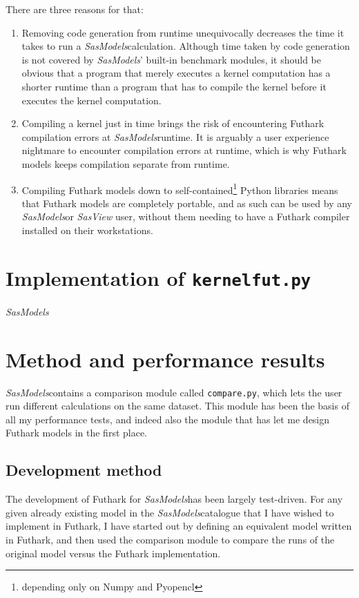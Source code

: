 \documentclass[11pt]{article}
\newcommand{\sasmodels}{\textit{SasModels}}
\newcommand{\sasview}{\textit{SasView}}
\begin{document}
There are three reasons for that:
\begin{enumerate}
  \item Removing code generation from runtime unequivocally decreases the time
  it takes to run a \sasmodels calculation. Although time taken by code 
  generation is not covered by \sasmodels' built-in benchmark modules, it should
  be obvious that a program that merely executes a kernel computation has a 
  shorter runtime than a program that has to compile the kernel before it
  executes the kernel computation.
  
  \item Compiling a kernel just in time brings the risk of encountering 
  Futhark compilation errors at \sasmodels runtime. 
  It is arguably a user experience nightmare to encounter compilation errors at 
  runtime, which is why Futhark models keeps compilation separate from runtime.
  
  \item Compiling Futhark models down to self-contained\footnote{depending only 
  on Numpy and Pyopencl} Python libraries means that Futhark models are 
  completely portable, and as such can be used by any \sasmodels or \sasview 
  user, without them needing to have a Futhark compiler installed on their 
  workstations.
\end{enumerate}

\section{Implementation of \texttt{kernelfut.py}}
\sasmodels 


\section{Method and performance results}
\sasmodels contains a comparison module called \texttt{compare.py}, which
lets the user run different calculations on the same dataset.
This module has been the basis of all my performance tests, and indeed also
the module that has let me design Futhark models in the first place.

\subsection{Development method}
The development of Futhark for \sasmodels has been largely test-driven.
For any given already existing model in the \sasmodels catalogue that I have
wished to implement in Futhark, I have started out by defining an equivalent
model written in Futhark, and then used the comparison module to compare the
 runs of the original model versus the Futhark implementation.
\end{document}
